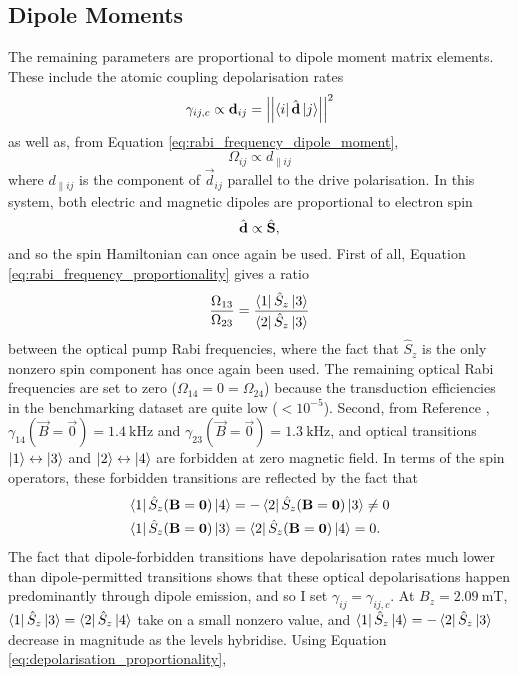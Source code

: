\subsection{Dipole Moments}
The remaining parameters are proportional to dipole moment matrix elements. These include the atomic coupling depolarisation rates
\begin{equation}
    \gamma_{ij,c} \propto \boldsymbol{\mathbf{d}}_{ij} = \left|\left|\left\langle i\right|\hat{\boldsymbol{\mathbf{d}}}\left|j\right\rangle\right|\right|^2 \label{eq:depolarisation_proportionality}
\end{equation}
as well as, from Equation \ref{eq:rabi_frequency_dipole_moment},
\begin{equation}
    \Omega_{ij} \propto d_{\parallel ij} \label{eq:rabi_frequency_proportionality}
\end{equation}
where $d_{\parallel ij}$ is the component of $\vec{d}_{ij}$ parallel to the drive polarisation. In this system, both electric and magnetic dipoles are proportional to electron spin
\begin{equation}
    \hat{\boldsymbol{\mathbf{d}}} \propto \hat{\boldsymbol{\mathbf{S}}},
\end{equation}
and so the spin Hamiltonian can once again be used. First of all, Equation \ref{eq:rabi_frequency_proportionality} gives a ratio
\begin{equation}
    \frac{\Omega_{13}}{\Omega_{23}} = \frac{\left\langle1\right|\hat{S}_z\left|3\right\rangle}{\left\langle2\right|\hat{S}_z\left|3\right\rangle} \label{eq:optical_rabi_frequency_ratio}
\end{equation}
between the optical pump Rabi frequencies, where the fact that $\hat{S}_z$ is the only nonzero spin component has once again been used. The remaining optical Rabi frequencies are set to zero ($\Omega_{14}=0=\Omega_{24}$) because the transduction efficiencies in the benchmarking dataset are quite low ($<10^{-5}$). Second, from Reference \cite{kindem_characterization_2018}, $\gamma_{14}(\vec{B}=\vec{0}) = \qty{1.4}{\kilo\hertz}$ and $\gamma_{23}(\vec{B}=\vec{0}) = \qty{1.3}{\kilo\hertz}$, and optical transitions $\left|1\right\rangle\leftrightarrow\left|3\right\rangle$ and $\left|2\right\rangle\leftrightarrow\left|4\right\rangle$ are forbidden at zero magnetic field. In terms of the spin operators, these forbidden transitions are reflected by the fact that
\begin{align}
    \left\langle1\right|\hat{S}_z(\boldsymbol{\mathbf{B}}=\boldsymbol{\mathbf{0}})\left|4\right\rangle &= -\left\langle2\right|\hat{S}_z(\boldsymbol{\mathbf{B}}=\boldsymbol{\mathbf{0}})\left|3\right\rangle \neq 0\\
    \left\langle1\right|\hat{S}_z(\boldsymbol{\mathbf{B}}=\boldsymbol{\mathbf{0}})\left|3\right\rangle &= \left\langle2\right|\hat{S}_z(\boldsymbol{\mathbf{B}}=\boldsymbol{\mathbf{0}})\left|4\right\rangle = 0.
\end{align}
The fact that dipole-forbidden transitions have depolarisation rates much lower than dipole-permitted transitions shows that these optical depolarisations happen predominantly through dipole emission, and so I set $\gamma_{ij}=\gamma_{ij,c}$. At $B_z=\qty{2.09}{\milli\tesla}$, $\left\langle1\right|\hat{S}_z\left|3\right\rangle = \left\langle2\right|\hat{S}_z\left|4\right\rangle$ take on a small nonzero value, and $\left\langle1\right|\hat{S}_z\left|4\right\rangle = -\left\langle2\right|\hat{S}_z\left|3\right\rangle$ decrease in magnitude as the levels hybridise. Using Equation \ref{eq:depolarisation_proportionality},
